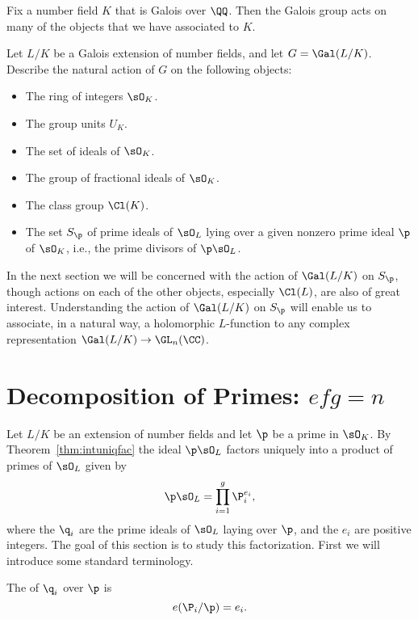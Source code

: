 Fix a number field $K$ that is Galois over $\QQ$.
Then the Galois group acts on many of the objects
that we have associated to $K$.

\begin{exercise}\label{ex:galois-action-on-things}
  Let $L/K$ be a Galois extension of number fields, and let $G = \Gal(L/K)$.
  Describe the natural action of $G$ on the following objects:
  \begin{itemize}
    \item The ring of integers $\sO_K$.
    \item The group units $U_K$.
    \item The set of ideals of $\sO_K$.
    \item The group of fractional ideals of $\sO_K$.
    \item The class group $\Cl(K)$.
    \item The set $S_\p$ of prime ideals of $\sO_L$ lying over a given nonzero
          prime ideal $\p$ of $\sO_K$, i.e., the prime divisors of $\p\sO_L$.
  \end{itemize}
\end{exercise}

In the next section we will be concerned with the action of
$\Gal(L/K)$ on $S_\p$, though actions on each of the other objects,
especially $\Cl(L)$, are also of great interest. Understanding the
action of $\Gal(L/K)$ on $S_{\p}$ will enable us to associate, in a
natural way, a holomorphic $L$-function to any complex representation
$\Gal(L/K) \to \GL_n(\CC)$.

\section{Decomposition of Primes: $efg=n$}

Let $L/K$ be an extension of number fields and let $\p$ be a prime
in $\sO_K$. By Theorem~\ref{thm:intuniqfac} the ideal $\p\sO_L$ factors
uniquely into a product of primes of $\sO_L$ given by
\[
  \p\sO_L = \prod_{i=1}^g \P^{e_i}_i,
\]
where the $\q_i$ are the prime ideals of $\sO_L$ laying over $\p$, and
the $e_i$ are positive integers. The goal of this section is to study this
factorization. First we will introduce some standard terminology.

\begin{definition}
  The  of $\q_i$ over $\p$ is
  \[
    e(\P_i/\p) = e_i.
  \]
\end{definition}

